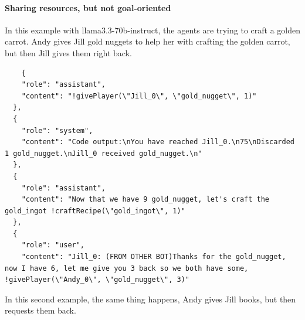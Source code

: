 \documentclass{article}
\begin{document}
\paragraph{Sharing resources, but not goal-oriented}
In this example with llama3.3-70b-instruct, the agents are trying to craft a golden carrot. Andy gives Jill gold nuggets to help her with crafting the golden carrot, but then Jill gives them right back. 
\begin{lstlisting}
    {
    "role": "assistant",
    "content": "!givePlayer(\"Jill_0\", \"gold_nugget\", 1)"
  },
  {
    "role": "system",
    "content": "Code output:\nYou have reached Jill_0.\n75\nDiscarded 1 gold_nugget.\nJill_0 received gold_nugget.\n"
  },
  {
    "role": "assistant",
    "content": "Now that we have 9 gold_nugget, let's craft the gold_ingot !craftRecipe(\"gold_ingot\", 1)"
  },
  {
    "role": "user",
    "content": "Jill_0: (FROM OTHER BOT)Thanks for the gold_nugget, now I have 6, let me give you 3 back so we both have some, !givePlayer(\"Andy_0\", \"gold_nugget\", 3)"
\end{lstlisting}

In this second example, the same thing happens, Andy gives Jill books, but then requests them back. 
\end{document}
